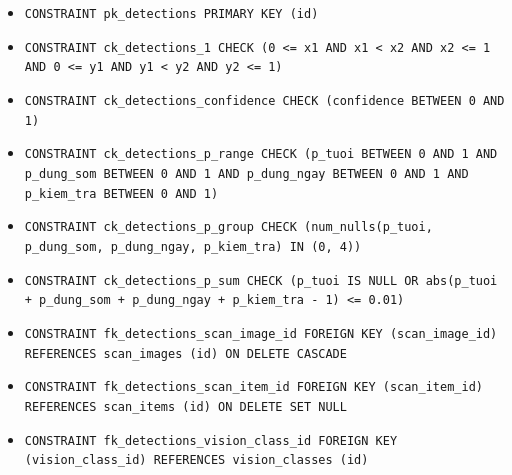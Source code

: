 \begin{itemize}
\item \raggedright {\small\texttt{CONSTRAINT pk\_\allowbreak{}\allowbreak{}detections PRIMARY KEY (id)}}
\item \raggedright {\small\texttt{CONSTRAINT ck\_\allowbreak{}\allowbreak{}detections\_\allowbreak{}\allowbreak{}1 CHECK (0 <= x1 AND x1 < x2 AND x2 <= 1 AND 0 <= y1 AND y1 < y2 AND y2 <= 1)}}
\item \raggedright {\small\texttt{CONSTRAINT ck\_\allowbreak{}\allowbreak{}detections\_\allowbreak{}\allowbreak{}confidence CHECK (confidence BETWEEN 0 AND 1)}}
\item \raggedright {\small\texttt{CONSTRAINT ck\_\allowbreak{}\allowbreak{}detections\_\allowbreak{}\allowbreak{}p\_\allowbreak{}\allowbreak{}range CHECK (p\_\allowbreak{}\allowbreak{}tuoi BETWEEN 0 AND 1 AND p\_\allowbreak{}\allowbreak{}dung\_\allowbreak{}\allowbreak{}som BETWEEN 0 AND 1 AND p\_\allowbreak{}\allowbreak{}dung\_\allowbreak{}\allowbreak{}ngay BETWEEN 0 AND 1 AND p\_\allowbreak{}\allowbreak{}kiem\_\allowbreak{}\allowbreak{}tra BETWEEN 0 AND 1)}}
\item \raggedright {\small\texttt{CONSTRAINT ck\_\allowbreak{}\allowbreak{}detections\_\allowbreak{}\allowbreak{}p\_\allowbreak{}\allowbreak{}group CHECK (num\_\allowbreak{}\allowbreak{}nulls(p\_\allowbreak{}\allowbreak{}tuoi, p\_\allowbreak{}\allowbreak{}dung\_\allowbreak{}\allowbreak{}som, p\_\allowbreak{}\allowbreak{}dung\_\allowbreak{}\allowbreak{}ngay, p\_\allowbreak{}\allowbreak{}kiem\_\allowbreak{}\allowbreak{}tra) IN (0, 4))}}
\item \raggedright {\small\texttt{CONSTRAINT ck\_\allowbreak{}\allowbreak{}detections\_\allowbreak{}\allowbreak{}p\_\allowbreak{}\allowbreak{}sum CHECK (p\_\allowbreak{}\allowbreak{}tuoi IS NULL OR abs(p\_\allowbreak{}\allowbreak{}tuoi + p\_\allowbreak{}\allowbreak{}dung\_\allowbreak{}\allowbreak{}som + p\_\allowbreak{}\allowbreak{}dung\_\allowbreak{}\allowbreak{}ngay + p\_\allowbreak{}\allowbreak{}kiem\_\allowbreak{}\allowbreak{}tra -\allowbreak{} 1) <= 0.\allowbreak{}01)}}
\item \raggedright {\small\texttt{CONSTRAINT fk\_\allowbreak{}\allowbreak{}detections\_\allowbreak{}\allowbreak{}scan\_\allowbreak{}\allowbreak{}image\_\allowbreak{}\allowbreak{}id FOREIGN KEY (scan\_\allowbreak{}\allowbreak{}image\_\allowbreak{}\allowbreak{}id) REFERENCES scan\_\allowbreak{}\allowbreak{}images (id) ON DELETE CASCADE}}
\item \raggedright {\small\texttt{CONSTRAINT fk\_\allowbreak{}\allowbreak{}detections\_\allowbreak{}\allowbreak{}scan\_\allowbreak{}\allowbreak{}item\_\allowbreak{}\allowbreak{}id FOREIGN KEY (scan\_\allowbreak{}\allowbreak{}item\_\allowbreak{}\allowbreak{}id) REFERENCES scan\_\allowbreak{}\allowbreak{}items (id) ON DELETE SET NULL}}
\item \raggedright {\small\texttt{CONSTRAINT fk\_\allowbreak{}\allowbreak{}detections\_\allowbreak{}\allowbreak{}vision\_\allowbreak{}\allowbreak{}class\_\allowbreak{}\allowbreak{}id FOREIGN KEY (vision\_\allowbreak{}\allowbreak{}class\_\allowbreak{}\allowbreak{}id) REFERENCES vision\_\allowbreak{}\allowbreak{}classes (id)}}
\end{itemize}
